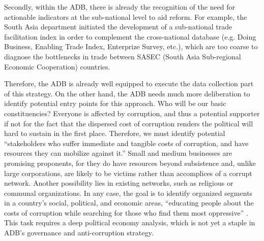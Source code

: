 \documentclass[12pt]{article}
\begin{document}
Secondly, within the ADB, there is already the recognition of the need for actionable indicators at the sub-national level to aid reform. For example, the South Asia department initiated the development of a sub-national trade facilitation index in order to complement the cross-national database (e.g. Doing Business, Enabling Trade Index, Enterprize Survey, etc.), which are too coarse to diagnose the bottlenecks in trade between SASEC (South Asia Sub-regional Economic Cooperation) countries.

Therefore, the ADB is already well equipped to execute the data collection part of this strategy. On the other hand, the ADB needs much more deliberation to identify potential entry points for this approach. Who will be our basic constituencies? Everyone is affected by corruption, and thus a potential supporter if not for the fact that the dispersed cost of corruption renders the political will hard to sustain in the first place. Therefore, we must identify potential ``stakeholders who suffer immediate and tangible costs of corruption, and have resources they can mobilize against it.'' Small and medium businesses are promising proponents, for they do have resources beyond subsistence and, unlike large corporations, are likely to be victims rather than accomplices of a corrupt network. Another possibility lies in existing networks, such as religious or communal organizations. In any case, the goal is to identify organized segments in a country's social, political, and economic areas, ``educating people about the costs of corruption while searching for those who find them most oppressive'' \citep[7]{Johnston2002}. This task requires a deep political economy analysis, which is not yet a staple in ADB's governance and anti-corruption strategy.

\newpage


\end{document}

